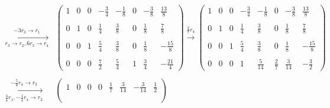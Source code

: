 \documentclass{article}
\begin{document}
\begin{enumerate}
\begin{enumerate}
\begin{align*}
        \end{align*}
        \begin{align*}
            \xrightarrow[r_3 \to r_2,6r_3 \to r_4]{-3r_3 \to r_1}
            &\begin{pmatrix}
                1 & 0 & 0 & \displaystyle{-\frac{3}{4}} & \displaystyle{-\frac{1}{8}} & 0 & \displaystyle{-\frac{3}{8}} & \displaystyle{\frac{13}{8}}\\ \\
                0 & 1 & 0 &  \displaystyle{\frac{1}{4}} & \displaystyle{ \frac{3}{8}} & 0 & \displaystyle{\frac{1}{8}} & \displaystyle{\frac{7}{8}}\\ \\
                0 & 0 & 1 &  \displaystyle{\frac{5}{4}} &  \displaystyle{\frac{3}{8}} & 0 & \displaystyle{\frac{1}{8}} & \displaystyle{-\frac{15}{8}}\\ \\
                0 & 0 & 0 &  \displaystyle{\frac{7}{2}} & \displaystyle{ \frac{5}{4}} & 1 & \displaystyle{\frac{3}{4}} & \displaystyle{-\frac{21}{4}}
            \end{pmatrix}
            \xrightarrow{\frac{2}{7} r_4}
            \begin{pmatrix}
                1 & 0 & 0 & \displaystyle{-\frac{3}{4}} & \displaystyle{-\frac{1}{8}} & 0 & \displaystyle{-\frac{3}{8}} & \displaystyle{\frac{13}{8}}\\ \\
                0 & 1 & 0 &  \displaystyle{\frac{1}{4}} & \displaystyle{\frac{3}{8}} & 0 &  \displaystyle{\frac{1}{8}} & \displaystyle{\frac{7}{8}}\\ \\
                0 & 0 & 1 &  \displaystyle{\frac{5}{4}} & \displaystyle{\frac{3}{8}} & 0 &  \displaystyle{\frac{1}{8}} & \displaystyle{-\frac{15}{8}}\\ \\
                0 & 0 & 0 &  1 & \displaystyle{\frac{5}{14}} & \displaystyle{\frac{2}{7}} &  \displaystyle{\frac{3}{14}} &  \displaystyle{-\frac{3}{2}}
            \end{pmatrix}\\ & \\
            \xrightarrow[\frac{3}{4}r_1,-\frac{1}{4}r_4 \to r_2]{-\frac{5}{4}r_4 \to r_3}
            &\begin{pmatrix}
                1 & 0 & 0 & 0 &  \displaystyle{\frac{1}{7}}  &  \displaystyle{\frac{3}{14}} & \displaystyle{-\frac{3}{14}} & \displaystyle{\frac{1}{2}}\\ \\

\end{pmatrix}
\end{align*}
\end{enumerate}
\end{enumerate}
\end{document}
